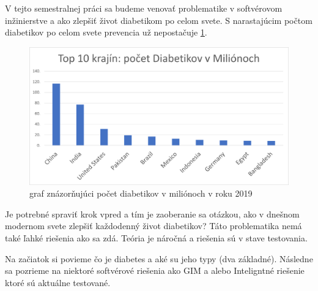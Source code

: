 V tejto semestralnej práci sa budeme venovať problematike v softvérovom inžinierstve a ako zlepšiť život diabetikom po celom svete. S narastajúcim počtom diabetikov po celom svete prevencia už nepostačuje \ref{graf}.

\begin{figure}[H]
\centering
\includegraphics[width=\linewidth]{pocet_diabetikov.png}
\caption{graf znázorňujúci počet diabetikov v miliónoch v roku 2019 \cite{2019s}}
\label{graf}
\end{figure}

Je potrebné spraviť krok vpred a tím je zaoberanie sa otázkou, ako v dnešnom modernom svete zlepšiť každodenný život diabetikov? 
Táto problematika nemá také ľahké riešenia ako sa zdá. Teória je náročná a riešenia sú v stave testovania.

Na začiatok si povieme čo je diabetes a aké su jeho typy (dva základné). Následne sa pozrieme na niektoré softvérové riešenia ako GIM a alebo Inteligntné riešenie ktoré sú aktuálne testované.
 




